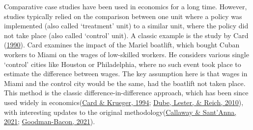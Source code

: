 \documentclass[12pt,nobind, a4paper]{reedthesis}
\begin{document}
 Comparative case studies have been used in economics for a long time. However, studies typically relied on the comparison between one unit where a policy was implemented (also called `treatment' unit) to a similar unit, where the policy did not take place (also called `control' unit). A classic example is the study by Card (\protect\hyperlink{ref-card_impact_1990}{1990}). Card examines the impact of the Mariel boatlift, which bought Cuban workers to Miami on the wages of low-skilled workers. He considers various single `control' cities like Houston or Philadelphia, where no such event took place to estimate the difference between wages. The key assumption here is that wages in Miami and the control city would be the same, had the boatlift not taken place. This method is the classic difference-in-difference approach, which has been since used widely in economics(\protect\hyperlink{ref-card_minimum_1994}{Card \& Krueger, 1994}; \protect\hyperlink{ref-dube_minimum_2010}{Dube, Lester, \& Reich, 2010}), with interesting updates to the original methodology(\protect\hyperlink{ref-callaway_difference-differences_2021}{Callaway \& Sant'Anna, 2021}; \protect\hyperlink{ref-goodman-bacon_difference-differences_2021}{Goodman-Bacon, 2021}).
 \linebreak
\end{document}
